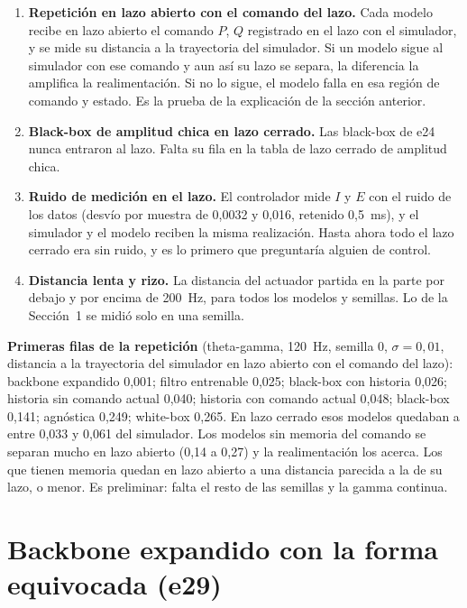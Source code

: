\documentclass[11pt,a4paper]{article}
\begin{document}
\begin{enumerate}[leftmargin=*,itemsep=0.35em]
\item \textbf{Repetición en lazo abierto con el comando del lazo.} Cada modelo recibe en lazo abierto el comando $P$, $Q$ registrado en el lazo con el simulador, y se mide su distancia a la trayectoria del simulador. Si un modelo sigue al simulador con ese comando y aun así su lazo se separa, la diferencia la amplifica la realimentación. Si no lo sigue, el modelo falla en esa región de comando y estado. Es la prueba de la explicación de la sección anterior.
\item \textbf{Black-box de amplitud chica en lazo cerrado.} Las black-box de e24 nunca entraron al lazo. Falta su fila en la tabla de lazo cerrado de amplitud chica.
\item \textbf{Ruido de medición en el lazo.} El controlador mide $I$ y $E$ con el ruido de los datos (desvío por muestra de 0,0032 y 0,016, retenido 0,5~ms), y el simulador y el modelo reciben la misma realización. Hasta ahora todo el lazo cerrado era sin ruido, y es lo primero que preguntaría alguien de control.
\item \textbf{Distancia lenta y rizo.} La distancia del actuador partida en la parte por debajo y por encima de 200~Hz, para todos los modelos y semillas. Lo de la Sección~1 se midió solo en una semilla.
\end{enumerate}

\textbf{Primeras filas de la repetición} (theta-gamma, 120~Hz, semilla 0, $\sigma = 0{,}01$, distancia a la trayectoria del simulador en lazo abierto con el comando del lazo): backbone expandido 0,001; filtro entrenable 0,025; black-box con historia 0,026; historia sin comando actual 0,040; historia con comando actual 0,048; black-box 0,141; agnóstica 0,249; white-box 0,265. En lazo cerrado esos modelos quedaban a entre 0,033 y 0,061 del simulador. Los modelos sin memoria del comando se separan mucho en lazo abierto (0,14 a 0,27) y la realimentación los acerca. Los que tienen memoria quedan en lazo abierto a una distancia parecida a la de su lazo, o menor. Es preliminar: falta el resto de las semillas y la gamma continua.

\section{Backbone expandido con la forma equivocada (e29)}
\end{document}
